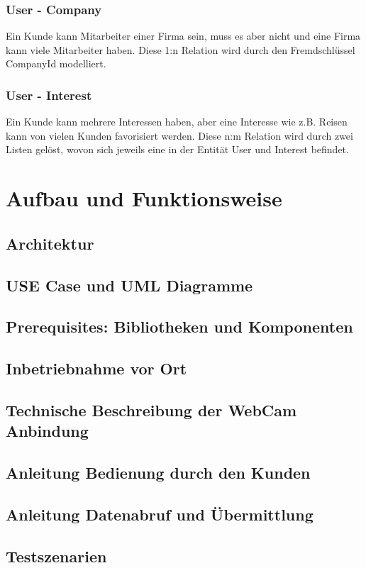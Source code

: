 \subsubsection{User - Company}
Ein Kunde kann Mitarbeiter einer Firma sein, muss es aber nicht und eine Firma kann viele Mitarbeiter haben. Diese 1:n Relation wird durch den Fremdschlüssel CompanyId modelliert.

\subsubsection{User - Interest}
Ein Kunde kann mehrere Interessen haben, aber eine Interesse wie z.B. Reisen kann von vielen Kunden favorisiert werden. Diese n:m Relation wird durch zwei Listen gelöst, wovon sich jeweils eine in der Entität User und Interest befindet.

\section{Aufbau und Funktionsweise}
\subsection{Architektur}
\subsection{USE Case und UML Diagramme}
\subsection{Prerequisites: Bibliotheken und Komponenten}
\subsection{Inbetriebnahme vor Ort}
\subsection{Technische Beschreibung der WebCam Anbindung}
\subsection{Anleitung Bedienung durch den Kunden}
\subsection{Anleitung Datenabruf und Übermittlung}
\subsection{Testszenarien}

